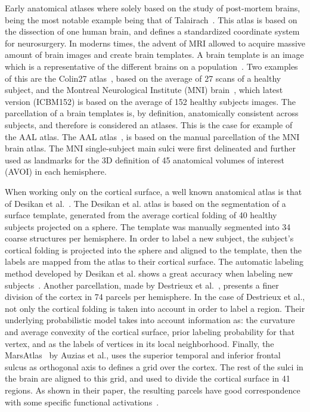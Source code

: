 Early anatomical atlases where solely based on the study of post-mortem brains,
being the most notable example being that of Talairach~\cite{Talairach1988}.
This atlas is based on the dissection of one human brain, and defines a
standardized coordinate system for neurosurgery. In moderns times, the
advent of MRI allowed to acquire massive amount
of brain images and create brain templates. A brain template is an image
which is a representative of the different brains on a population~\cite{Evans2012}. Two
examples of this are the Colin27 atlas~\cite{Collins1998}, based on the average
of 27 scans of a healthy subject, and the Montreal Neurological Institute (MNI) brain~\cite{Holmes1998},
which latest version (ICBM152) is based on the average of 152 healthy subjects images.
The parcellation of a brain templates is, by definition, anatomically
consistent across subjects, and therefore is considered an atlases. This is the
case for example of the AAL atlas. The AAL atlas~\cite{Landeau2002}, is based on the manual
parcellation of the MNI brain atlas. The MNI single-subject main sulci were
first delineated and further used as landmarks for the 3D definition of 45
anatomical volumes of interest (AVOI) in each hemisphere.

When working only on the cortical surface, a well known anatomical atlas is that of
Desikan et al.~\cite{Desikan2006}. The Desikan et al. atlas is based on the segmentation
of a surface
template, generated from the average cortical folding of 40 healthy subjects
projected on a sphere. The template was manually segmented into 34 coarse 
structures per hemisphere. In order to label a new subject, the subject's cortical 
folding is projected into the sphere and aligned to the template, then 
the labels are mapped from the atlas to their cortical surface. The automatic
labeling method developed by Desikan et al. shows a great accuracy when labeling
new subjects~\cite{Desikan2006}. Another parcellation, made by 
Destrieux et al.~\cite{Destrieux2010}, presents a finer division of the cortex in
74 parcels per hemisphere. In the case of Destrieux et al., not only the cortical
folding is taken into account in order to label a region. Their
underlying probabilistic model takes into account information as: the curvature
and average convexity of the cortical surface, prior labeling probability for
that vertex, and as the labels of vertices in its local neighborhood.
Finally, the MarsAtlas~\cite{Auzias2016} by Auzias et al., uses the superior temporal
and inferior frontal sulcus as orthogonal axis to defines a grid over the cortex.
The rest of the sulci in the brain are aligned to this grid, and used to divide
the cortical surface in 41 regions. As shown in their paper, the resulting parcels
have good correspondence with some specific functional activations~\cite{Auzias2016}.

